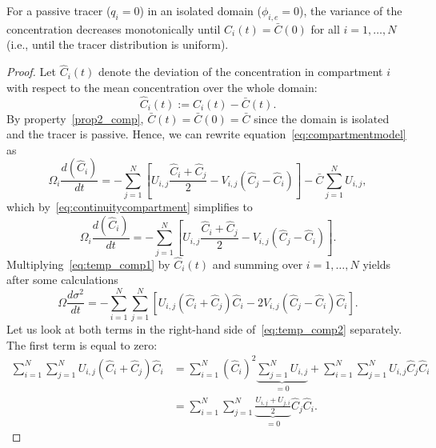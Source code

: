 \begin{property} \label{prop3_comp}
	For a passive tracer ($q_i = 0$) in an isolated domain ($\phi_{i,e} = 0$), the variance of the concentration decreases monotonically until $C_i(t) = \bar{C}(0)$ for all $i = 1,\dots,N$ (i.e., until the tracer distribution is uniform).
\end{property}
\begin{proof}
	Let $\hat{C}_i(t)$ denote the deviation of the concentration in compartment $i$ with respect to the mean concentration over the whole domain:
	\begin{equation}
		\hat{C}_i(t) := C_i(t) - \bar C(t).
	\end{equation}
	By property~\ref{prop2_comp}, $\bar C(t) = \bar C(0) = \bar C$ since the domain is isolated and the tracer is passive. Hence, we can rewrite equation~\eqref{eq:compartmentmodel} as 
	\begin{equation}
		\Omega_i \frac{d(\hat C_i)}{dt} = - \sum_{j=1}^N \left[ U_{i,j}\frac{\hat C_i + \hat C_j}{2} - V_{i,j} (\hat C_j - \hat C_i)\right] - \bar C \sum_{j=1}^N U_{i,j},
	\end{equation}
	which by~\eqref{eq:continuitycompartment} simplifies to
	\begin{equation} \label{eq:temp_comp1}
		\Omega_i \frac{d(\hat C_i)}{dt} = - \sum_{j=1}^N \left[ U_{i,j}\frac{\hat C_i + \hat C_j}{2} - V_{i,j} (\hat C_j - \hat C_i)\right].
	\end{equation}
	Multiplying~\eqref{eq:temp_comp1} by $\hat C_i(t)$ and summing over $i = 1,\dots,N$ yields after some calculations
	\begin{equation} \label{eq:temp_comp2}
		\Omega \frac{d \sigma^2}{dt} = - \sum_{i=1}^N \sum_{j=1}^N \left[ U_{i,j}(\hat C_i + \hat C_j)\hat C_i - 2 V_{i,j} (\hat C_j - \hat C_i) \hat C_i\right].
	\end{equation}
	Let us look at both terms in the right-hand side of~\eqref{eq:temp_comp2} separately. The first term is equal to zero:
	\begin{subequations}
	 	\begin{align}
	 		\sum_{i=1}^N \sum_{j=1}^N U_{i,j}(\hat C_i + \hat C_j)\hat C_i &= \sum_{i=1}^N \left(\hat C_i \right)^2 \underbrace{\sum_{j=1}^N U_{i,j}}_{= 0} + \sum_{i=1}^N \sum_{j=1}^N U_{i,j}\hat C_j\hat C_i\\
	 		&= \sum_{i=1}^N \sum_{j=1}^N \underbrace{\frac{U_{i,j} + U_{j,i}}{2}}_{=0}\hat C_j\hat C_i.
	 	\end{align}
	 \end{subequations} 

\end{proof}
